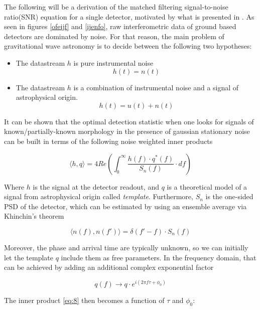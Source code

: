 The following will be a derivation of the matched filtering signal-to-noise ratio(SNR) equation for a single detector, motivated by what is presented in \cite{Sathyaprakash:2009xs,Creighton:2011zz,Maggiore:2007ulw,Saulson:1995zi}. As seen in figures \ref{ofeijf} and \ref{ijenfo}, raw interferometric data of ground based detectors are dominated by noise. For that reason, the main problem of gravitational wave astronomy is to decide between the following two hypotheses:

\begin{itemize}
\item The datastream $h$ is pure instrumental noise
$$ h(t) = n(t)$$
\item The datastream $h$ is a combination of instrumental noise and a signal of astrophysical origin.
$$ h(t) = u(t) + n(t)$$
\end{itemize}


It can be shown that the optimal detection statistic when one looks for signals of known/partially-known morphology in the presence of gaussian stationary noise can be built in terms of the following noise weighted inner products

\begin{equation}\label{eq:8}
\langle h,q \rangle =4 Re\left( \int_{0}^{\infty} \frac{h(f) \cdot q^{*}(f)}{S_n(f)} \cdot df \right)
\end{equation}

Where $h$ is the signal at the detector readout, and $q$ is a theoretical model of a signal from astrophysical origin called \textit{template}. Furthermore, $S_n$ is the one-sided PSD of the detector,  which can be estimated by using an ensemble average via Khinchin's theorem

\begin{equation}\label{PSD}
\langle n(f), n(f') \rangle = \delta(f'-f) \cdot S_n(f)
\end{equation}


Moreover, the phase and arrival time are typically unknown, so we can initially let the template $q$  include them as free parameters. In the frequency domain, that can be achieved by adding an additional complex exponential factor 


\begin{equation}
q(f)\rightarrow q\cdot e^{i(2\pi f \tau + \phi_0)}
\end{equation}

The inner product \ref{eq:8} then becomes a function of $\tau$ and $\phi_0$:

